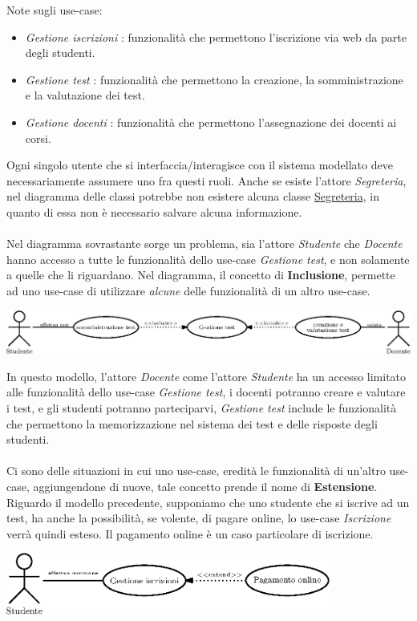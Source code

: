 \documentclass[12pt, letterpaper]{article}
\newcommand{\acc}{\\\hphantom{}\\}
\begin{document}
Note sugli use-case:\begin{itemize}
    \item \textit{Gestione iscrizioni} : funzionalità che permettono l'iscrizione via web da parte degli studenti.
    \item \textit{Gestione test} : funzionalità che permettono la creazione, la somministrazione e la valutazione 
    dei test.
    \item \textit{Gestione docenti} : funzionalità che permettono l'assegnazione dei docenti ai corsi.
\end{itemize}
Ogni singolo utente che si interfaccia/interagisce con il sistema modellato deve necessariamente assumere uno  
fra questi ruoli. Anche se esiste l'attore \textit{Segreteria}, nel diagramma delle classi potrebbe non esistere alcuna 
classe \underline{Segreteria}, in quanto di essa non è necessario salvare alcuna informazione.\acc 
Nel diagramma sovrastante sorge un problema, sia l'attore \textit{Studente} che \textit{Docente} hanno accesso 
a tutte le funzionalità dello use-case \textit{Gestione test}, e non solamente a quelle che li riguardano. Nel diagramma, 
il concetto di \textbf{Inclusione}, permette ad uno use-case di utilizzare \textit{alcune} delle funzionalità 
di un altro use-case.\begin{center}
    \includegraphics[width=\textwidth ]{images/inclusione.eps}
\end{center}
In questo modello, l'attore \textit{Docente} come l'attore \textit{Studente} ha un accesso limitato alle funzionalità dello 
use-case \textit{Gestione test}, i docenti potranno creare e valutare i test, e gli studenti potranno parteciparvi, 
\textit{Gestione test} include le funzionalità che permettono la memorizzazione nel sistema dei test e delle 
risposte degli studenti.\acc 
Ci sono delle situazioni in cui uno use-case, eredità le funzionalità di un'altro use-case, aggiungendone di nuove,
tale concetto prende il nome di \textbf{Estensione}. Riguardo il modello precedente, supponiamo che uno studente che 
si iscrive ad un test, ha anche la possibilità, se volente, di pagare online, 
lo use-case \textit{Iscrizione} verrà quindi esteso. Il pagamento online è un caso particolare di iscrizione.
\begin{center}
    \includegraphics[width=0.8\textwidth ]{images/estensioneUse-case.eps}
\end{center}
\end{document}
